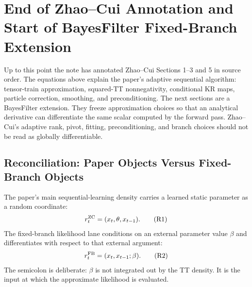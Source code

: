 \documentclass[11pt]{article}
\begin{document}
\section{End of Zhao--Cui Annotation and Start of BayesFilter Fixed-Branch Extension}

Up to this point the note has annotated Zhao--Cui Sections 1--3 and 5 in
source order.  The equations above explain the paper's adaptive sequential
algorithm: tensor-train approximation, squared-TT nonnegativity, conditional KR
maps, particle correction, smoothing, and preconditioning.  The next sections
are a BayesFilter extension.  They freeze approximation choices so that an
analytical derivative can differentiate the same scalar computed by the forward
pass.  Zhao--Cui's adaptive rank, pivot, fitting, preconditioning, and branch
choices should not be read as globally differentiable.

\subsection*{Reconciliation: Paper Objects Versus Fixed-Branch Objects}

The paper's main sequential-learning density carries a learned static
parameter as a random coordinate:
\[
    r_t^{\rm ZC}=(x_t,\theta,x_{t-1}).
    \tag{R1}
\]
The fixed-branch likelihood lane conditions on an external parameter value
\(\beta\) and differentiates with respect to that external argument:
\[
    r_t^{\rm FB}=(x_t,x_{t-1};\beta).
    \tag{R2}
\]
The semicolon is deliberate: \(\beta\) is not integrated out by the TT density.
It is the input at which the approximate likelihood is evaluated.
\end{document}
